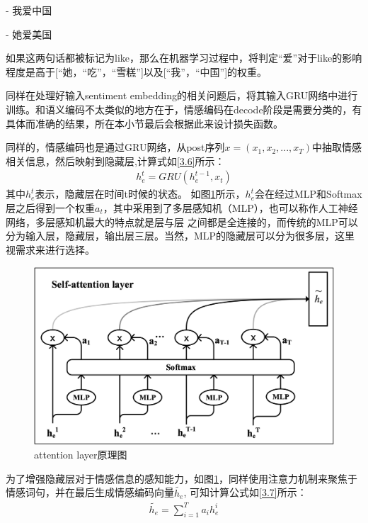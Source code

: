\documentclass[supercite]{HustGraduPaper}
\theoremstyle{definition}
\begin{document}
\begin{shaded*}
    - 我爱中国

    - 她爱美国
\end{shaded*}

如果这两句话都被标记为like，那么在机器学习过程中，将判定“爱”对于like的影响程度是高于[“她，“吃”，“雪糕”]以及[“我”，“中国”]的权重。

同样在处理好输入sentiment embedding的相关问题后，将其输入GRU网络中进行训练。和语义编码不太类似的地方在于，情感编码在decode阶段是需要分类的，有
具体而准确的结果，所在本小节最后会根据此来设计损失函数。

同样的，情感编码也是通过GRU网络，从post序列$x = (x_1,x_2,...,x_T)$中抽取情感相关信息，然后映射到隐藏层,计算式如\ref{3.6}所示：
\begin{align}
  h_e^t = GRU(h_e^{t-1},x_t) \label{3.6}
\end{align}
其中$h_e^t$表示，隐藏层在时间t时候的状态。
如图\ref{Fig.attentionemotion}所示，$h_e^t$会在经过MLP和Softmax层之后得到一个权重$a_t$，其中采用到了多层感知机（MLP），也可以称作人工神经网络，多层感知机最大的特点就是层与层
之间都是全连接的，而传统的MLP可以分为输入层，隐藏层，输出层三层。当然，MLP的隐藏层可以分为很多层，这里视需求来进行选择。
\begin{figure}[!htb] %
  \centering %
  \includegraphics[width=1\textwidth]{images/attentionemotion.png} %
  \caption{attention layer原理图} %
  \label{Fig.attentionemotion} %
\end{figure}

为了增强隐藏层对于情感信息的感知能力，如图\ref{Fig.attentionemotion}，同样使用注意力机制来聚焦于情感词句，并在最后生成情感编码向量$\widetilde{h_e}$,
可知计算公式如\ref{3.7}所示：
\begin{align}
  \widetilde{h_e} = \sum_{i=1}^{T}a_i h_e^i \label{3.7}
\end{align}
\end{document}

